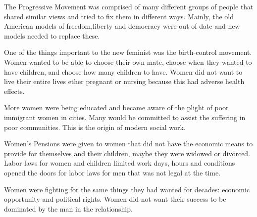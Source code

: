 The Progressive Movement was comprised of many different groups of people that shared similar views and tried to fix them in different ways.
Mainly, the old American models of freedom,liberty and democracy were out of date and new models needed to replace these.

One of the things important to the new feminist was the birth-control movement.
Women wanted to be able to choose their own mate, choose when they wanted to have children, and choose how many children to have.
Women did not want to live their entire lives ether pregnant or nursing because this had adverse health effects.

More women were being educated and became aware of the plight of poor immigrant women in cities.
Many would be committed to assist the suffering in poor communities. This is the origin of modern social work.

Women's Pensions were given to women that did not have the economic means to provide for themselves and their children, maybe they were widowed or divorced.
Labor laws for women and children limited work days, hours and conditions opened the doors for labor laws for men that was not legal at the time.

Women were fighting for the same things they had wanted for decades: economic opportunity and political rights.
Women did not want their success to be dominated by the man in the relationship.
